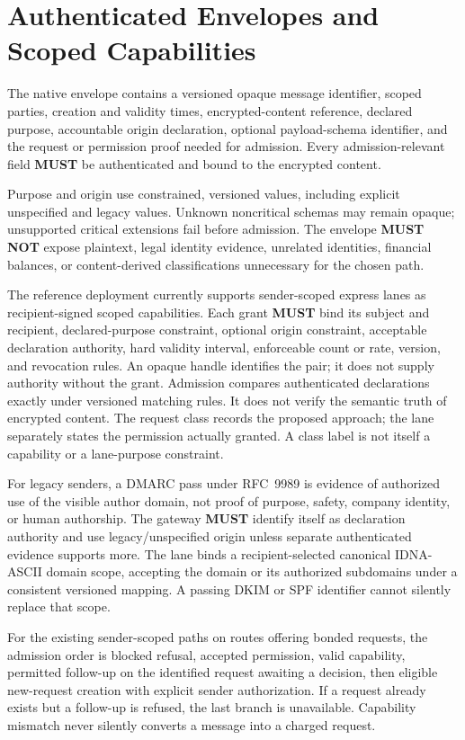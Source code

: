 \documentclass[11pt]{article}
\newcommand{\MUST}{\textbf{MUST}}
\newcommand{\MUSTNOT}{\textbf{MUST NOT}}
\begin{document}
\section{Authenticated Envelopes and Scoped Capabilities}

The native envelope contains a versioned opaque message identifier, scoped
parties, creation and validity times, encrypted-content reference, declared
purpose, accountable origin declaration, optional payload-schema identifier, and
the request or permission proof needed for admission. Every admission-relevant
field \MUST{} be authenticated and bound to the encrypted content.

Purpose and origin use constrained, versioned values, including explicit
unspecified and legacy values. Unknown noncritical schemas may remain opaque;
unsupported critical extensions fail before admission. The envelope \MUSTNOT{}
expose plaintext, legal identity evidence, unrelated identities, financial
balances, or content-derived classifications unnecessary for the chosen path.

The reference deployment currently supports sender-scoped express lanes as
recipient-signed scoped capabilities. Each grant \MUST{} bind its subject and recipient, declared-purpose
constraint, optional origin constraint, acceptable declaration authority,
hard validity interval, enforceable count or rate, version, and revocation rules.
An opaque handle identifies the pair; it does not supply authority without the
grant. Admission compares authenticated declarations exactly under versioned
matching rules. It does not verify the semantic truth of encrypted content.
The request class records the proposed approach; the lane separately states the
permission actually granted. A class label is not itself a capability or a
lane-purpose constraint.

For legacy senders, a DMARC pass under RFC~9989 is evidence of authorized use of
the visible author domain, not proof of purpose, safety, company identity, or
human authorship. The gateway \MUST{} identify itself as declaration authority
and use legacy/unspecified origin unless separate authenticated evidence supports
more. The lane binds a recipient-selected canonical IDNA-ASCII domain scope,
accepting the domain or its authorized subdomains under a consistent versioned
mapping. A passing DKIM or SPF identifier cannot silently replace that scope.

For the existing sender-scoped paths on routes offering bonded requests,
the admission order is blocked refusal, accepted permission, valid capability,
permitted follow-up on the identified request awaiting a decision, then eligible new-request
creation with explicit sender authorization. If a request already exists but a
follow-up is refused, the last branch is unavailable. Capability mismatch never
silently converts a message into a charged request.
\end{document}
